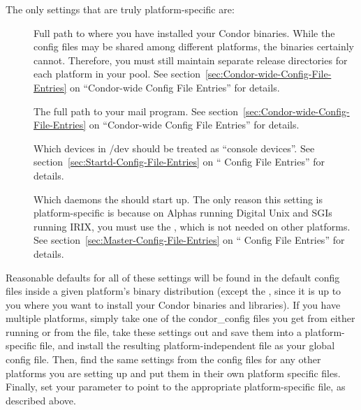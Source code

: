 The only settings that are truly platform-specific are:

\begin{description}

\item[] Full path to where you have installed your
  Condor binaries.  While the config files may be shared among
  different platforms, the binaries certainly cannot.  Therefore, you
  must still maintain separate release directories for each platform
  in your pool.  See section~\ref{sec:Condor-wide-Config-File-Entries}
  on ``Condor-wide Config File Entries'' for details.

\item[] The full path to your mail program.  See
  section~\ref{sec:Condor-wide-Config-File-Entries} on ``Condor-wide
  Config File Entries'' for details.

\item[] Which devices in /dev should be
  treated as ``console devices''.  See
  section~\ref{sec:Startd-Config-File-Entries} on ``
  Config File Entries'' for details.

\item[] Which daemons the  should
  start up.  The only reason this setting is platform-specific is
  because on Alphas running Digital Unix and SGIs running IRIX, you
  must use the , which is not needed on other platforms.
  See section~\ref{sec:Master-Config-File-Entries} on
  `` Config File Entries'' for details.

\end{description}

Reasonable defaults for all of these settings will be found in the
default config files inside a given platform's binary distribution
(except the , since it is up to you where you want
to install your Condor binaries and libraries).  If you have multiple
platforms, simply take one of the condor\_config files you get from
either running  or from the
 file, take these settings
out and save them into a platform-specific file, and install the
resulting platform-independent file as your global config file.  Then,
find the same settings from the config files for any other platforms
you are setting up and put them in their own platform specific files.
Finally, set your  parameter to point to
the appropriate platform-specific file, as described above.

